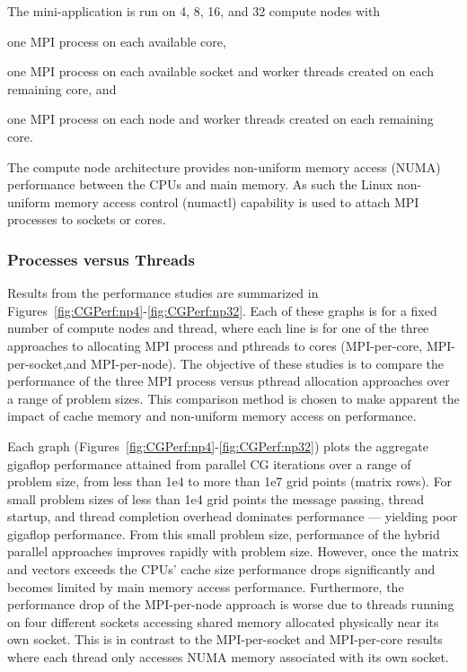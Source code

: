 The mini-application is run on 4, 8, 16, and 32 compute nodes with 
\begin{blist}
\item one MPI process on each available core, 
\item one MPI process on each available socket and worker threads created on each remaining core, and
\item one MPI process on each node and worker threads created on each remaining core.
\end{blist}
%
The compute node architecture provides non-uniform memory access (NUMA) performance between the CPUs and main memory.
%
As such the Linux non-uniform memory access control (numactl) capability is used to attach MPI processes to sockets or cores.



\subsubsection{Processes versus Threads}

Results from the performance studies are summarized in Figures~\ref{fig:CGPerf:np4}-\ref{fig:CGPerf:np32}.
%
Each of these graphs is for a fixed number of compute nodes and thread, where each line is for one of the three approaches to allocating MPI process and pthreads to cores (MPI-per-core, MPI-per-socket,and MPI-per-node).
%
The objective of these studies is to compare the performance of the three MPI process versus pthread allocation approaches over a range of problem sizes.
%
This comparison method is chosen to make apparent the impact of cache memory and non-uniform memory access on performance.


Each graph (Figures~\ref{fig:CGPerf:np4}-\ref{fig:CGPerf:np32}) plots the aggregate gigaflop performance attained from parallel CG iterations over a range of problem size, from less than 1e4 to more than 1e7 grid points (matrix rows).
%
For small problem sizes of less than 1e4 grid points the message passing, thread startup, and thread completion overhead dominates performance --- yielding poor gigaflop performance.
%
From this small problem size, performance of the hybrid parallel approaches improves rapidly with problem size.
%
However, once the matrix and vectors exceeds the CPUs' cache size performance drops significantly and becomes limited by main memory access performance.
%
Furthermore, the performance drop of the MPI-per-node approach is worse due to threads running on four different sockets accessing shared memory allocated physically near its own socket.
%
This is in contrast to the MPI-per-socket and MPI-per-core results where each thread only accesses NUMA memory associated with its own socket.

